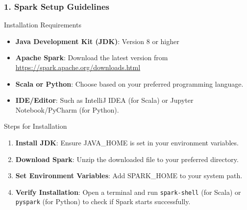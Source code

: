 \documentclass{beamer}
\begin{document}
\begin{frame}
    \frametitle{1. Spark Setup Guidelines}
    \begin{block}{Installation Requirements}
        \begin{itemize}
            \item \textbf{Java Development Kit (JDK)}: Version 8 or higher
            \item \textbf{Apache Spark}: Download the latest version from \url{https://spark.apache.org/downloads.html}
            \item \textbf{Scala or Python}: Choose based on your preferred programming language.
            \item \textbf{IDE/Editor}: Such as IntelliJ IDEA (for Scala) or Jupyter Notebook/PyCharm (for Python).
        \end{itemize}
    \end{block}

    \begin{block}{Steps for Installation}
        \begin{enumerate}
            \item \textbf{Install JDK}: Ensure JAVA\_HOME is set in your environment variables.
            \item \textbf{Download Spark}: Unzip the downloaded file to your preferred directory.
            \item \textbf{Set Environment Variables}: Add SPARK\_HOME to your system path.
            \item \textbf{Verify Installation}: Open a terminal and run \texttt{spark-shell} (for Scala) or \texttt{pyspark} (for Python) to check if Spark starts successfully.
        \end{enumerate}
    \end{block}
\end{frame}
\end{document}
